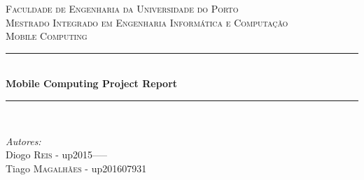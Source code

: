 \documentclass[12pt]{article}
\begin{document}
\begin{titlepage}

\newcommand{\HRule}{\rule{\linewidth}{0.25mm}} %

\center %


\textsc{\LARGE Faculdade de Engenharia da Universidade do Porto}\\[0.5cm] %
\textsc{\Large Mestrado Integrado em Engenharia Informática e Computação}\\[0.5cm] %
\textsc{\large Mobile Computing}\\[0.5cm] %


\HRule \\[0.75cm]
{ \huge \bfseries Mobile Computing Project Report}\\[0.4cm] %
\HRule \\[1cm]


\begin{minipage}{0.6\textwidth}
\begin{flushleft} \large
\emph{Autores:}\\
Diogo \textsc{Reis} - up2015-----\\
Tiago \textsc{Magalhães} - up201607931\\

\end{flushleft}
\end{minipage}
~
\begin{minipage}{0.35\textwidth}
\begin{flushright} \large
\end{flushright}
\end{minipage}\\[1cm]


\end{titlepage}
\end{document}
